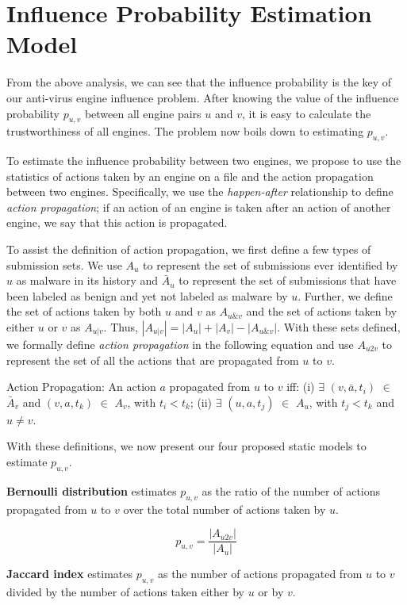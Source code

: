 \section{Influence Probability Estimation Model}
\label{sec:influenceprob}
From the above analysis, we can see that the influence probability is the key of our anti-virus engine
influence problem.
After knowing the value of the influence probability $p_{u,v}$ between all engine pairs $u$ and $v$,
it is easy to calculate the trustworthiness of all engines.
The problem now boils down to estimating $p_{u,v}$.

To estimate the influence probability between two engines, we propose to use the statistics of actions taken by
an engine on a file and the action propagation between two engines. 
Specifically, we use the {\em happen-after} relationship to
define {\em action propagation}; if an action of an engine is taken after an action of another engine, we say that
this action is propagated.

To assist the definition of action propagation, we first define a few types of submission sets.
We use $A_u$ to represent the set of submissions ever identified by $u$ as malware in its history
and $\bar{A}_u$ to represent the set of submissions that have been labeled as benign and yet not labeled as malware by $u$.
Further, we define the set of actions taken by both $u$ and $v$ as $A_{u\&v}$ 
and the set of actions taken by either $u$ or $v$ as $A_{u|v}$.
Thus, $|A_{u|v}| =   |A_u| + |A_v| - |A_{u\&v}|$.
With these sets defined, we formally
define {\em action propagation} in the following equation 
and use $A_{u2v}$ to represent the set of all the actions that are propagated from $u$ to $v$. 

Action Propagation:
An action $a$ propagated from $u$ to $v$ iff: (i) $\exists$ $(v, \bar{a}, t_i)$ $\in$ $\bar{A}_v$ 
and $(v, a, t_k)$ $\in$ $A_v$, with $t_i < t_k$; (ii) $\exists$ $(u, a, t_j)$ $\in$ $A_u$, with $t_j < t_k$ and $u \neq v$. 


With these definitions, we now present our four proposed static models to estimate $p_{u,v}$.

{\bf Bernoulli distribution} estimates $p_{u,v}$ as the ratio of the number of actions 
propagated from $u$ to $v$ over the total number of actions taken by $u$.

$$p_{u,v} = \frac{|A_{u2v}|}{|A_u|}$$ 

{\bf Jaccard index} estimates 
$p_{u,v}$ as the number of actions propagated from $u$ to $v$ divided by 
the number of actions taken either by $u$ or by $v$.

